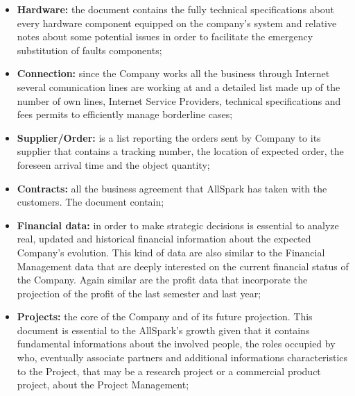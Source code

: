 \begin{itemize}
  \item {\bf Hardware:} the document contains the fully technical specifications about every hardware component equipped on the company's system and relative notes about some potential issues in order to facilitate the emergency substitution of faults components;
  \item {\bf Connection:} since the Company works all the business through Internet several comunication lines are working at and a detailed list made up of the number of own lines, Internet Service Providers, technical specifications and fees permits to efficiently manage borderline cases;
  \item {\bf Supplier/Order:} is a list reporting the orders sent by Company to its supplier that contains a tracking number, the location of expected order, the foreseen arrival time and the object quantity;
  \item {\bf Contracts:} all the business agreement that AllSpark has taken with the customers. The document contain;
  \item {\bf Financial data:} in order to make strategic decisions is essential to analyze real, updated and historical financial information about the expected Company's evolution. This kind of data are also similar to the Financial Management data that are deeply interested on the current financial status of the Company. Again similar are the profit data that incorporate the projection of the profit of the last semester and last year;
  \item {\bf Projects:} the core of the Company and of its future projection. This document is essential to the AllSpark's growth given that it contains fundamental informations about the involved people, the roles occupied by who, eventually associate partners and additional informations characteristics to the Project, that may be a research project or a commercial product project, about the Project Management;

\end{itemize}
